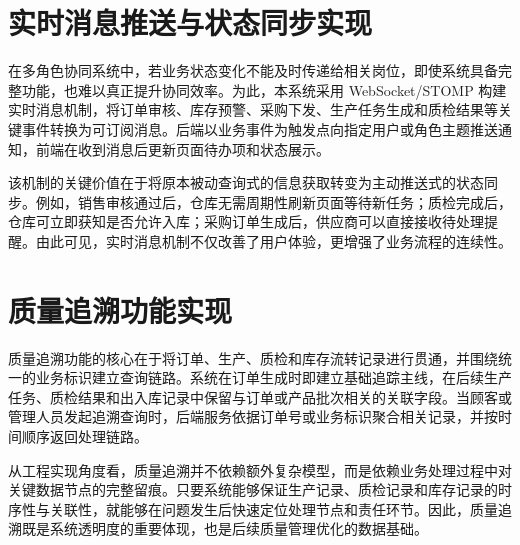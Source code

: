 \section{实时消息推送与状态同步实现}

在多角色协同系统中，若业务状态变化不能及时传递给相关岗位，即使系统具备完整功能，也难以真正提升协同效率。为此，本系统采用 WebSocket/STOMP 构建实时消息机制，将订单审核、库存预警、采购下发、生产任务生成和质检结果等关键事件转换为可订阅消息。后端以业务事件为触发点向指定用户或角色主题推送通知，前端在收到消息后更新页面待办项和状态展示。

该机制的关键价值在于将原本被动查询式的信息获取转变为主动推送式的状态同步。例如，销售审核通过后，仓库无需周期性刷新页面等待新任务；质检完成后，仓库可立即获知是否允许入库；采购订单生成后，供应商可以直接接收待处理提醒。由此可见，实时消息机制不仅改善了用户体验，更增强了业务流程的连续性。

\section{质量追溯功能实现}

质量追溯功能的核心在于将订单、生产、质检和库存流转记录进行贯通，并围绕统一的业务标识建立查询链路。系统在订单生成时即建立基础追踪主线，在后续生产任务、质检结果和出入库记录中保留与订单或产品批次相关的关联字段。当顾客或管理人员发起追溯查询时，后端服务依据订单号或业务标识聚合相关记录，并按时间顺序返回处理链路。

从工程实现角度看，质量追溯并不依赖额外复杂模型，而是依赖业务处理过程中对关键数据节点的完整留痕。只要系统能够保证生产记录、质检记录和库存记录的时序性与关联性，就能够在问题发生后快速定位处理节点和责任环节。因此，质量追溯既是系统透明度的重要体现，也是后续质量管理优化的数据基础。
